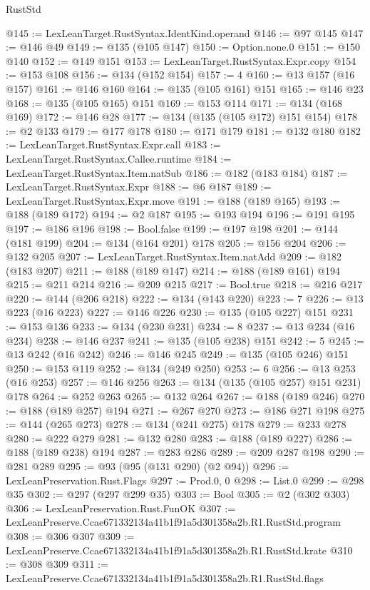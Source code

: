 \begin{lexlean}{RustStd}
\begin{coremodule}
@145 := LexLeanTarget.RustSyntax.IdentKind.operand
@146 := @97 @145
@147 := @146 @49
@149 := @135 (@105 @147)
@150 := Option.none.{0}
@151 := @150 @140
@152 := @149 @151
@153 := LexLeanTarget.RustSyntax.Expr.copy
@154 := @153 @108
@156 := @134 (@152 @154)
@157 := 4
@160 := @13 @157 (@16 @157)
@161 := @146 @160
@164 := @135 (@105 @161) @151
@165 := @146 @23
@168 := @135 (@105 @165) @151
@169 := @153 @114
@171 := @134 (@168 @169)
@172 := @146 @28
@177 := @134 (@135 (@105 @172) @151 @154)
@178 := @2 @133
@179 := @177 @178
@180 := @171 @179
@181 := @132 @180
@182 := LexLeanTarget.RustSyntax.Expr.call
@183 := LexLeanTarget.RustSyntax.Callee.runtime
@184 := LexLeanTarget.RustSyntax.Item.natSub
@186 := @182 (@183 @184)
@187 := LexLeanTarget.RustSyntax.Expr
@188 := @6 @187
@189 := LexLeanTarget.RustSyntax.Expr.move
@191 := @188 (@189 @165)
@193 := @188 (@189 @172)
@194 := @2 @187
@195 := @193 @194
@196 := @191 @195
@197 := @186 @196
@198 := Bool.false
@199 := @197 @198
@201 := @144 (@181 @199)
@204 := @134 (@164 @201) @178
@205 := @156 @204
@206 := @132 @205
@207 := LexLeanTarget.RustSyntax.Item.natAdd
@209 := @182 (@183 @207)
@211 := @188 (@189 @147)
@214 := @188 (@189 @161) @194
@215 := @211 @214
@216 := @209 @215
@217 := Bool.true
@218 := @216 @217
@220 := @144 (@206 @218)
@222 := @134 (@143 @220)
@223 := 7
@226 := @13 @223 (@16 @223)
@227 := @146 @226
@230 := @135 (@105 @227) @151
@231 := @153 @136
@233 := @134 (@230 @231)
@234 := 8
@237 := @13 @234 (@16 @234)
@238 := @146 @237
@241 := @135 (@105 @238) @151
@242 := 5
@245 := @13 @242 (@16 @242)
@246 := @146 @245
@249 := @135 (@105 @246) @151
@250 := @153 @119
@252 := @134 (@249 @250)
@253 := 6
@256 := @13 @253 (@16 @253)
@257 := @146 @256
@263 := @134 (@135 (@105 @257) @151 @231) @178
@264 := @252 @263
@265 := @132 @264
@267 := @188 (@189 @246)
@270 := @188 (@189 @257) @194
@271 := @267 @270
@273 := @186 @271 @198
@275 := @144 (@265 @273)
@278 := @134 (@241 @275) @178
@279 := @233 @278
@280 := @222 @279
@281 := @132 @280
@283 := @188 (@189 @227)
@286 := @188 (@189 @238) @194
@287 := @283 @286
@289 := @209 @287 @198
@290 := @281 @289
@295 := @93 (@95 (@131 @290) (@2 @94))
@296 := LexLeanPreservation.Rust.Flags
@297 := Prod.{0, 0}
@298 := List.{0}
@299 := @298 @35
@302 := @297 (@297 @299 @35)
@303 := Bool
@305 := @2 (@302 @303)
@306 := LexLeanPreservation.Rust.FunOK
@307 := LexLeanPreserve.Ccae671332134a41b1f91a5d301358a2b.R1.RustStd.program
@308 := @306 @307
@309 := LexLeanPreserve.Ccae671332134a41b1f91a5d301358a2b.R1.RustStd.krate
@310 := @308 @309
@311 := LexLeanPreserve.Ccae671332134a41b1f91a5d301358a2b.R1.RustStd.flags

\end{coremodule}
\end{lexlean}
